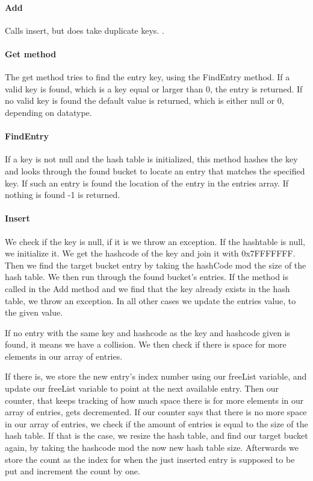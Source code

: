 \documentclass[titlepage]{article}
\begin{document}
	\paragraph{Add}
	Calls insert, but does take duplicate keys. .
	
	\paragraph{Get method}
	The get method tries to find the entry key, using the FindEntry method. If a valid key is found, which is a key equal or larger than 0, the entry is returned. If no valid key is found the default value is returned, which is either null or 0, depending on datatype. 
	
		
	\paragraph{FindEntry}
	If a key is not null and the hash table is initialized, this method hashes the key and looks through the found bucket to locate an entry that matches the specified key. If such an entry is found the location of the entry in the entries array. 
	If nothing is found -1 is returned. 
	
	
	
	\paragraph{Insert}
	We check if the key is null, if it is we throw an exception.
	If the hashtable is null, we initialize it. 
	We get the hashcode of the key and join it with 0x7FFFFFFF. 
	Then we find the target bucket entry by taking the hashCode mod the size of the hash table. 
	We then run through the found bucket's entries. 
	If the method is called in the Add method and we find that the key already exists in the hash table, we throw an exception. 
	In all other cases we update the entries value, to the given value. 
	
	If no entry with the same key and hashcode as the key and hashcode given is found, it means we have a collision. 
	We then check if there is space for more elements in our array of entries. 
	
	If there is, we store the new entry's index number using our freeList variable, and update our freeList variable to point at the next available entry. Then our counter, that keeps tracking of how much space there is for more elements in our array of entries, gets decremented.
	If our counter says that there is no more space in our array of entries, we check if the amount of entries is equal to the size of the hash table. If that is the case, we resize the hash table, and find our target bucket again, by taking the hashcode mod the now new hash table size. Afterwards we store the count as the index for when the just inserted entry is supposed to be put and increment the count by one. 
	
\end{document}
